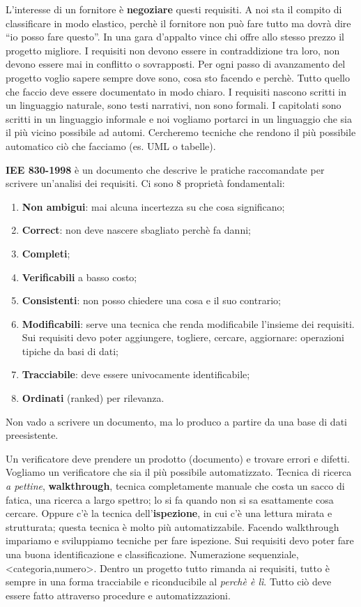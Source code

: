 L'interesse di un fornitore è \textbf{negoziare} questi requisiti. A noi sta il compito di classificare in modo elastico, perchè il fornitore non può fare tutto ma dovrà dire ``io posso fare questo''. In una gara d'appalto vince chi offre allo stesso prezzo il progetto migliore. I requisiti non devono essere in contraddizione tra loro, non devono essere mai in conflitto o sovrapposti. Per ogni passo di avanzamento del progetto voglio sapere sempre dove sono, cosa sto facendo e perchè. Tutto quello che faccio deve essere documentato in modo chiaro. I requisiti nascono scritti in un linguaggio naturale, sono testi narrativi, non sono formali. I capitolati sono scritti in un linguaggio informale e noi vogliamo portarci in un linguaggio che sia il più vicino possibile ad automi. Cercheremo tecniche che rendono il più possibile automatico ciò che facciamo (es. UML o tabelle).

\textbf{IEE 830-1998} è un documento che descrive le pratiche raccomandate per scrivere un'analisi dei requisiti. Ci sono 8 proprietà fondamentali:

\begin{enumerate}

	\item \textbf{Non ambigui}: mai alcuna incertezza su che cosa significano;
	\item \textbf{Correct}: non deve nascere sbagliato perchè fa danni;
	\item \textbf{Completi};
	\item \textbf{Verificabili} a basso costo;
	\item \textbf{Consistenti}: non posso chiedere una cosa e il suo contrario;
	\item \textbf{Modificabili}: serve una tecnica che renda modificabile l'insieme dei requisiti. Sui requisiti devo poter aggiungere, togliere, cercare, aggiornare: operazioni tipiche da basi di dati;
	\item \textbf{Tracciabile}: deve essere univocamente identificabile;
	\item \textbf{Ordinati} (ranked) per rilevanza.

\end{enumerate}

Non vado a scrivere un documento, ma lo produco a partire da una base di dati preesistente.

Un verificatore deve prendere un prodotto (documento) e trovare errori e difetti. Vogliamo un verificatore che sia il più possibile automatizzato. Tecnica di ricerca \textit{a pettine}, \textbf{walkthrough}, tecnica completamente manuale che costa un sacco di fatica, una ricerca a largo spettro; lo si fa quando non si sa esattamente cosa cercare. Oppure c'è la tecnica dell'\textbf{ispezione}, in cui c'è una lettura mirata e strutturata; questa tecnica è molto più automatizzabile. Facendo walkthrough impariamo e sviluppiamo tecniche per fare ispezione. Sui requisiti devo poter fare una buona identificazione e classificazione. Numerazione sequenziale, <categoria,numero>. Dentro un progetto tutto rimanda ai requisiti, tutto è sempre in una forma tracciabile e riconducibile al \textit{perchè è lì}. Tutto ciò deve essere fatto attraverso procedure e automatizzazioni.

